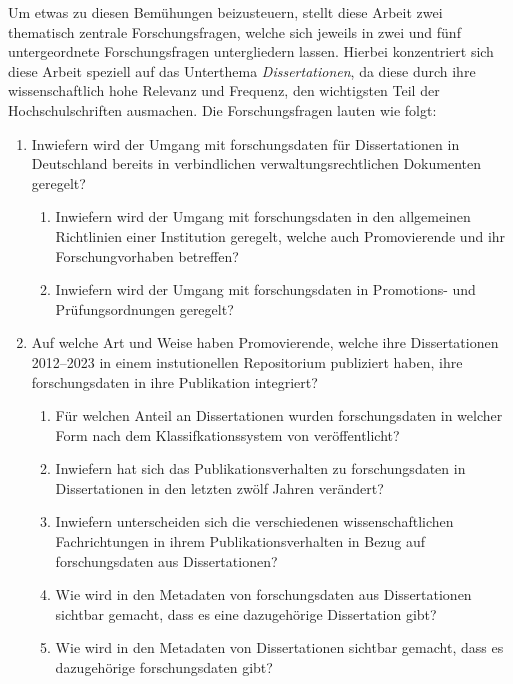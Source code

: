 Um etwas zu diesen Bemühungen beizusteuern, stellt diese Arbeit zwei thematisch zentrale Forschungsfragen, welche sich jeweils in zwei und fünf untergeordnete Forschungsfragen untergliedern lassen.
Hierbei konzentriert sich diese Arbeit speziell auf das Unterthema \textit{Dissertationen}, da diese durch ihre wissenschaftlich hohe Relevanz und Frequenz, den wichtigsten Teil der Hochschulschriften ausmachen.
Die Forschungsfragen lauten wie folgt:
\begin{enumerate}
    \item Inwiefern wird der Umgang mit \gls{forschungsdaten} für Dissertationen in Deutschland bereits in verbindlichen verwaltungsrechtlichen Dokumenten geregelt?
    \begin{enumerate}
        \item Inwiefern wird der Umgang mit \gls{forschungsdaten} in den allgemeinen Richtlinien einer Institution geregelt, welche auch Promovierende und ihr Forschungvorhaben betreffen?
        \item Inwiefern wird der Umgang mit \gls{forschungsdaten} in Promotions- und Prüfungsordnungen geregelt?
    \end{enumerate}
    \item Auf welche Art und Weise haben Promovierende, welche ihre Dissertationen 2012--2023 in einem instutionellen Repositorium publiziert haben, ihre \gls{forschungsdaten} in ihre Publikation integriert?
    \begin{enumerate}
        \item Für welchen Anteil an Dissertationen wurden \gls{forschungsdaten} in welcher Form nach dem Klassifkationssystem von \citeauthor{ReillyEtAl2011} \autocite{ReillyEtAl2011} veröffentlicht?
        \item Inwiefern hat sich das Publikationsverhalten zu \gls{forschungsdaten} in Dissertationen in den letzten zwölf Jahren verändert?
        \item Inwiefern unterscheiden sich die verschiedenen wissenschaftlichen Fachrichtungen in ihrem Publikationsverhalten in Bezug auf \gls{forschungsdaten} aus Dissertationen?
        \item Wie wird in den Metadaten von \gls{forschungsdaten} aus Dissertationen sichtbar gemacht, dass es eine dazugehörige Dissertation gibt?
        \item Wie wird in den Metadaten von Dissertationen sichtbar gemacht, dass es dazugehörige \gls{forschungsdaten} gibt?
    \end{enumerate}
\end{enumerate}
